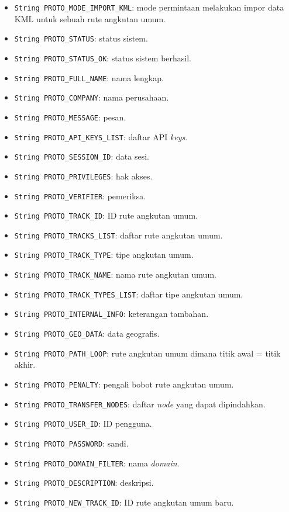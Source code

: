 \begin{itemize}
	\item \texttt{String PROTO\_MODE\_IMPORT\_KML}: mode permintaan melakukan impor data KML untuk sebuah rute angkutan umum.
	\item \texttt{String PROTO\_STATUS}: status sistem.
	\item \texttt{String PROTO\_STATUS\_OK}: status sistem berhasil.
	\item \texttt{String PROTO\_FULL\_NAME}: nama lengkap.
	\item \texttt{String PROTO\_COMPANY}: nama perusahaan.
	\item \texttt{String PROTO\_MESSAGE}: pesan.
	\item \texttt{String PROTO\_API\_KEYS\_LIST}: daftar API \textit{keys}.
	\item \texttt{String PROTO\_SESSION\_ID}: data sesi.
	\item \texttt{String PROTO\_PRIVILEGES}: hak akses.
	\item \texttt{String PROTO\_VERIFIER}: pemeriksa.
	\item \texttt{String PROTO\_TRACK\_ID}: ID rute angkutan umum.
	\item \texttt{String PROTO\_TRACKS\_LIST}: daftar rute angkutan umum.
	\item \texttt{String PROTO\_TRACK\_TYPE}: tipe angkutan umum.
	\item \texttt{String PROTO\_TRACK\_NAME}: nama rute angkutan umum.
	\item \texttt{String PROTO\_TRACK\_TYPES\_LIST}: daftar tipe angkutan umum.
	\item \texttt{String PROTO\_INTERNAL\_INFO}: keterangan tambahan.
	\item \texttt{String PROTO\_GEO\_DATA}: data geografis.
	\item \texttt{String PROTO\_PATH\_LOOP}: rute angkutan umum dimana titik awal = titik akhir.
	\item \texttt{String PROTO\_PENALTY}: pengali bobot rute angkutan umum.
	\item \texttt{String PROTO\_TRANSFER\_NODES}: daftar \textit{node} yang dapat dipindahkan.
	\item \texttt{String PROTO\_USER\_ID}: ID pengguna.
	\item \texttt{String PROTO\_PASSWORD}: sandi.
	\item \texttt{String PROTO\_DOMAIN\_FILTER}: nama \textit{domain}.
	\item \texttt{String PROTO\_DESCRIPTION}: deskripsi.
	\item \texttt{String PROTO\_NEW\_TRACK\_ID}: ID rute angkutan umum baru.

\end{itemize}
